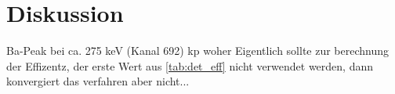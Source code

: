 \section{Diskussion}
\label{sec:Diskussion}
Ba-Peak bei ca. 275 keV (Kanal 692) kp woher
Eigentlich sollte zur berechnung der Effizentz, der erste Wert aus \ref{tab:det_eff} nicht verwendet werden, dann konvergiert das verfahren aber nicht...
